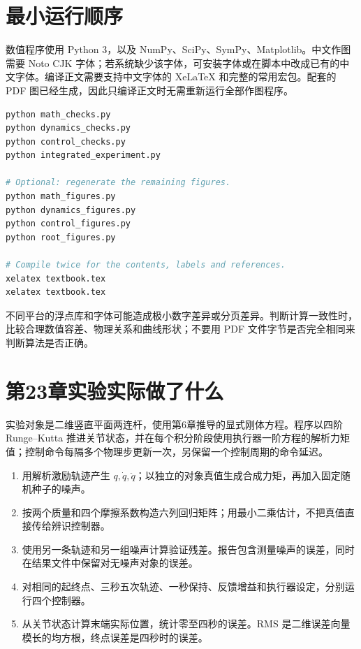 \section{最小运行顺序}

数值程序使用 Python 3，以及 NumPy、SciPy、SymPy、Matplotlib。中文作图需要 Noto CJK 字体；若系统缺少该字体，可安装字体或在脚本中改成已有的中文字体。编译正文需要支持中文字体的 XeLaTeX 和完整的常用宏包。配套的 PDF 图已经生成，因此只编译正文时无需重新运行全部作图程序。

\begin{lstlisting}[language=bash]
python math_checks.py
python dynamics_checks.py
python control_checks.py
python integrated_experiment.py

# Optional: regenerate the remaining figures.
python math_figures.py
python dynamics_figures.py
python control_figures.py
python root_figures.py

# Compile twice for the contents, labels and references.
xelatex textbook.tex
xelatex textbook.tex
\end{lstlisting}

不同平台的浮点库和字体可能造成极小数字差异或分页差异。判断计算一致性时，比较合理数值容差、物理关系和曲线形状；不要用 PDF 文件字节是否完全相同来判断算法是否正确。

\section{第23章实验实际做了什么}

实验对象是二维竖直平面两连杆，使用第6章推导的显式刚体方程。程序以四阶 Runge--Kutta 推进关节状态，并在每个积分阶段使用执行器一阶方程的解析力矩值；控制命令每隔多个物理步更新一次，另保留一个控制周期的命令延迟。

\begin{enumerate}
\item 用解析激励轨迹产生 $q,\dot q,\ddot q$；以独立的对象真值生成合成力矩，再加入固定随机种子的噪声。
\item 按两个质量和四个摩擦系数构造六列回归矩阵；用最小二乘估计，不把真值直接传给辨识控制器。
\item 使用另一条轨迹和另一组噪声计算验证残差。报告包含测量噪声的误差，同时在结果文件中保留对无噪声对象的误差。
\item 对相同的起终点、三秒五次轨迹、一秒保持、反馈增益和执行器设定，分别运行四个控制器。
\item 从关节状态计算末端实际位置，统计零至四秒的误差。RMS 是二维误差向量模长的均方根，终点误差是四秒时的误差。
\end{enumerate}


